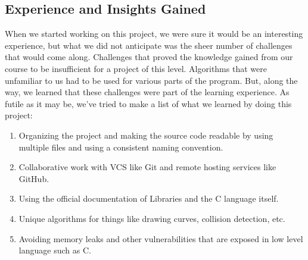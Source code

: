 \documentclass[report.tex]{subfiles}
\begin{document}
\begin{large}
    \section*{Experience and Insights Gained}
	When we started working on this project, we were sure it would be an interesting experience, but what we did not anticipate was the sheer number of challenges that would come along. Challenges that proved the knowledge gained from our course to be insufficient for a project of this level. Algorithms that were unfamiliar to us had to be used for various parts of the program. But, along the way, we learned that these challenges were part of the learning experience.
As futile as it may be, we've tried to make a list of what we learned by doing this project:
    \begin{enumerate}
        \item{Organizing the project and making the source code readable by using multiple files and using a consistent naming convention.}
        \item{Collaborative work with VCS like Git and remote hosting services like GitHub.}
        \item{Using the official documentation of Libraries and the C language itself.}
        \item{Unique algorithms for things like drawing curves, collision detection, etc.}
        \item{Avoiding memory leaks and other vulnerabilities that are exposed in low level language such as C.}
    \end{enumerate}
\end{large}
\end{document}
